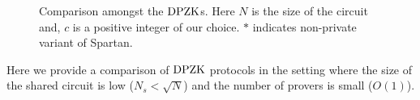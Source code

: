 \begin{figure}[h!]
	\centering
	\caption{\footnotesize Comparison amongst the $\text{DPZK}$s. Here $N$ is the size of the circuit and, $c$ is a positive integer of our choice. $\ast$ indicates non-private variant of Spartan.}\label{tab:DPZKwSmallN}
\end{figure}
\vspace{-.5cm}

Here we provide a comparison of $\text{DPZK}$ protocols in the setting where the size of the shared circuit is low ($N_s < \sqrt{N}$) and the number of provers is small ($O(1)$). 